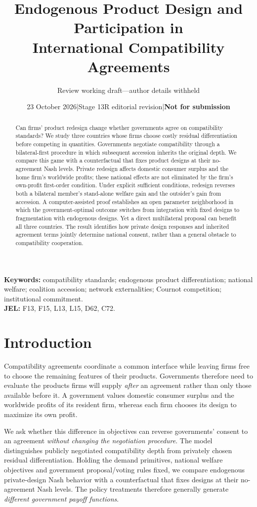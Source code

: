 \documentclass[11pt,a4paper]{article}
\title{Endogenous Product Design and Participation in\\ International Compatibility Agreements}
\author{Review working draft---author details withheld}
\date{23 October 2026\quad |\quad Stage 13R editorial revision\quad |\quad \textbf{Not for submission}}
\theoremstyle{remark}\newtheorem{remark}[theorem]{Remark}
\begin{document}
\maketitle
\begin{abstract}
Can firms' product redesign change whether governments agree on compatibility standards? We study three countries whose firms choose costly residual differentiation before competing in quantities. Governments negotiate compatibility through a bilateral-first procedure in which subsequent accession inherits the original depth. We compare this game with a counterfactual that fixes product designs at their no-agreement Nash levels. Private redesign affects domestic consumer surplus and the home firm's worldwide profits; these national effects are not eliminated by the firm's own-profit first-order condition. Under explicit sufficient conditions, redesign reverses both a bilateral member's stand-alone welfare gain and the outsider's gain from accession. A computer-assisted proof establishes an open parameter neighborhood in which the government-optimal outcome switches from integration with fixed designs to fragmentation with endogenous designs. Yet a direct multilateral proposal can benefit all three countries. The result identifies how private design responses and inherited agreement terms jointly determine national consent, rather than a general obstacle to compatibility cooperation.
\end{abstract}
\noindent\textbf{Keywords:} compatibility standards; endogenous product differentiation; national welfare; coalition accession; network externalities; Cournot competition; institutional commitment.\\
\textbf{JEL:} F13, F15, L13, L15, D62, C72.

\section{Introduction}

Compatibility agreements coordinate a common interface while leaving firms free to choose the remaining features of their products. Governments therefore need to evaluate the products firms will supply \emph{after} an agreement rather than only those available before it. A government values domestic consumer surplus and the worldwide profits of its resident firm, whereas each firm chooses its design to maximize its own profit.

We ask whether this difference in objectives can reverse governments' consent to an agreement \emph{without changing the negotiation procedure}. The model distinguishes publicly negotiated compatibility depth from privately chosen residual differentiation. Holding the demand primitives, national welfare objectives and government proposal/voting rules fixed, we compare endogenous private-design Nash behavior with a counterfactual that fixes designs at their no-agreement Nash levels. The policy treatments therefore generally generate \emph{different government payoff functions}.
\end{document}
